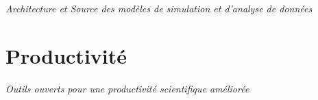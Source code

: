 \textit{Architecture et Source des modèles de simulation et d'analyse de données}


\section{Productivité}

\textit{Outils ouverts pour une productivité scientifique améliorée}















